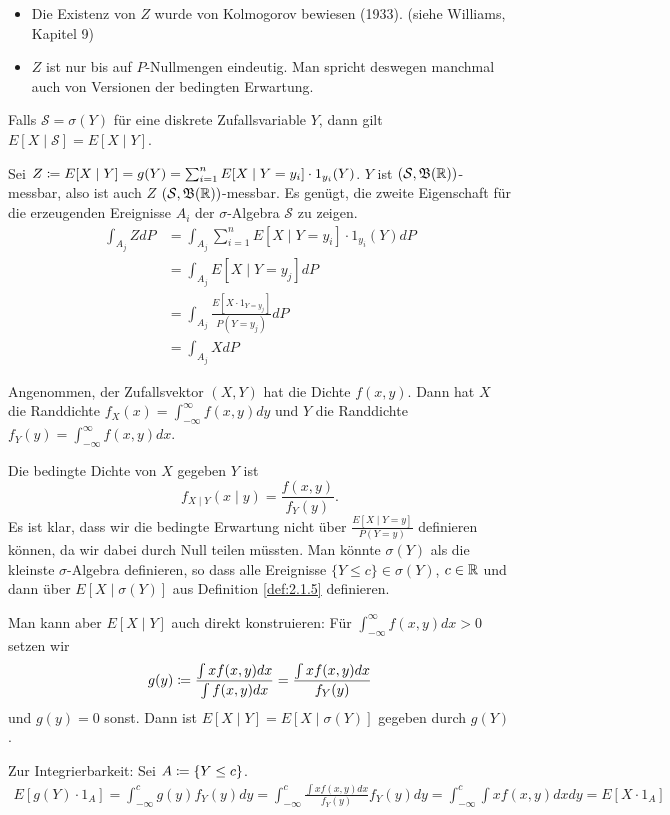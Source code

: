 \documentclass[a4paper,twoside,DIV15,BCOR12mm]{scrbook}
\newcommand{\borel}{{\mathfrak B}}
\begin{document}
\begin{bemerkung}
\begin{itemize}
\item Die Existenz von $Z$ wurde von Kolmogorov bewiesen (1933). (siehe Williams, Kapitel 9)
\item $Z$ ist nur bis auf $P$-Nullmengen eindeutig. Man spricht deswegen manchmal auch von Versionen der bedingten Erwartung.
\end{itemize}
\end{bemerkung}

\begin{lemma}
Falls $\mathcal S=\sigma(Y)$ für eine diskrete Zufallsvariable $Y$, dann gilt $E[X\mid \mathcal S] = E[X\mid Y]$.
\end{lemma}

\begin{beweis}
Sei $Z\da E[X\mid Y] = g(Y) = \sum_{i=1}^n E[X\mid Y = y_i] \cdot 1_{y_i}(Y)$. $Y$ ist $(\mathcal S,\borel(\MdR))$-messbar, also ist auch $Z$ $(\mathcal S,\borel(\MdR))$-messbar. Es genügt, die zweite Eigenschaft für die erzeugenden Ereignisse $A_i$ der $\sigma$-Algebra $\mathcal S$ zu zeigen.
\begin{align*}
\int_{A_j}Zd P &= \int_{A_j} \sum_{i=1}^n E[X\mid Y=y_i]\cdot 1_{y_i}(Y)dP \\
&= \int_{A_j} E[X \mid Y=y_j] dP \\
&= \int_{A_j} \frac{E[X\cdot 1_{Y=y_j}]}{P(Y=y_j)} dP \\
&= \int_{A_j} X dP
\end{align*}
\end{beweis}

\begin{bemerkung}
Angenommen, der Zufallsvektor $(X,Y)$ hat die Dichte $f(x,y)$. Dann hat $X$ die Randdichte $f_X(x) = \int_{-\infty}^\infty f(x,y)dy$ und $Y$ die Randdichte $f_Y(y)=\int_{-\infty}^\infty f(x,y)dx$.

Die bedingte Dichte von $X$ gegeben $Y$ ist 
\[
f_{X\mid Y} (x\mid y) = \frac{f(x,y)}{f_Y(y)}.
\]
Es ist klar, dass wir die bedingte Erwartung nicht über $\frac{E[X\mid Y=y]}{P(Y=y)}$ definieren können, da wir dabei durch Null teilen müssten. Man könnte $\sigma(Y)$ als die kleinste $\sigma$-Algebra definieren, so dass alle Ereignisse $\{Y\le c\}\in\sigma(Y)$, $c\in\mathbb{R}$ und dann über $E[X\mid \sigma(Y)]$ aus Definition \ref{def:2.1.5} definieren.

Man kann aber $E[X\mid Y]$ auch direkt konstruieren: Für $\int_{-\infty}^\infty f(x,y)dx > 0$ setzen wir 
\[
g(y) \da \frac{\int x f(x,y)dx}{\int f(x,y)dx} = 
\frac{\int x f(x,y)dx}{f_Y(y)}
\]
und $g(y) = 0$ sonst. Dann ist $E[X\mid Y] = E[X\mid \sigma(Y)]$ gegeben durch $g(Y)$.

Zur Integrierbarkeit: Sei $A\da \{Y\le c\}$.
\begin{align*}
E[g(Y)\cdot 1_A] = \int_{-\infty}^c g(y) f_Y(y)dy = \int_{-\infty}^c \frac{\int x f(x,y)dx}{f_Y(y)} f_Y(y) dy = \int_{-\infty}^c \int x f(x,y)dxdy = E[X\cdot 1_A]
\end{align*}
\end{bemerkung}
\end{document}
